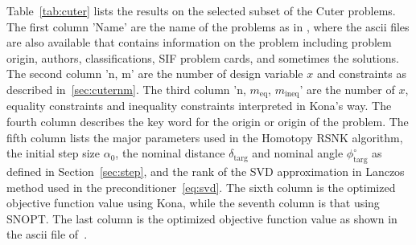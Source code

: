 Table~\ref{tab:cuter} lists the results on the selected subset of the Cuter problems. The first column 'Name'  are the name of the problems as in \cite{cuter_probs}, where the ascii files are also available that contains information on the problem including problem origin, authors, classifications, SIF problem cards, and sometimes the solutions. The second column 'n, m' are the number of design variable $x$ and constraints as described in~\ref{sec:cuternm}. The third column 'n,  $m_{\text{eq}}$,  $m_{\text{ineq}}$' are the number of $x$, equality constraints and inequality constraints interpreted in Kona's way. The fourth column describes the key word for the origin or origin of the problem. The fifth column lists the major parameters used in the Homotopy RSNK algorithm, the initial step size $\textbf{$\alpha_0$}$, the nominal distance  $\delta_{\text{targ}}$  and nominal angle $\phi^{\circ}_{\text{targ}}$ as defined in Section~\ref{sec:step}, and the rank of the SVD approximation in Lanczos method used in the preconditioner~\ref{eq:svd}. The sixth column is the optimized objective function value using Kona, while the seventh column is that using SNOPT. The last column is the optimized objective function value as shown in the ascii file of~\cite{cuter_probs}. 

